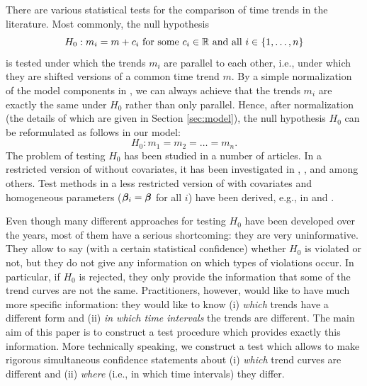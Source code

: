 \documentclass[12pt]{article}
\makeatletter
\renewcommand{\eqref}[1]{\tagform@{\ref{#1}}}
\makeatother
\begin{document}
There are various statistical tests for the comparison of time trends in the literature. Most commonly, the null hypothesis
\[ H_0: m_i = m + c_i \text{ for some } c_i \in \mathbb{R} \text{ and all } i \in \{1,\ldots,n\} \]
is tested under which the trends $m_i$ are parallel to each other, i.e., under which they are shifted versions of a common time trend $m$. By a simple normalization of the model components in \eqref{eq:model_full}, we can always achieve that the trends $m_i$ are exactly the same under $H_0$ rather than only parallel. Hence, after normalization (the details of which are given in Section \ref{sec:model}), the null hypothesis $H_0$ can be reformulated as follows in our model: 
\[ H_0: m_1 = m_2 = \ldots = m_n. \]   
The problem of testing $H_0$ has been studied in a number of articles. In a restricted version of \eqref{eq:model_full} without covariates, it has been investigated in \cite{HaerdleMarron1990}, \cite{Hall1990}, \cite{DegrasWu2012} and \cite{ChenWu2018} among others. Test methods in a less restricted version of \eqref{eq:model_full} with covariates and homogeneous parameters ($\bm{\beta}_i = \bm{\beta}$ for all $i$) have been derived, e.g., in \cite{Zhang2012} and \cite{Hidalgo2014}.


Even though many different approaches for testing $H_0$ have been developed over the years, most of them have a serious shortcoming: they are very uninformative. They allow to say (with a certain statistical confidence) whether $H_0$ is violated or not, but they do not give any information on which types of violations occur. In particular, if $H_0$ is rejected, they only provide the information that some of the trend curves are not the same. Practitioners, however, would like to have much more specific information: they would like to know (i) \textit{which} trends have a different form and (ii) \textit{in which time intervals} the trends are different. The main aim of this paper is to construct a test procedure which provides exactly this information. More technically speaking, we construct a test which allows to make rigorous simultaneous confidence statements about (i) \textit{which} trend curves are different and (ii) \textit{where} (i.e., in which time intervals) they differ. 
\end{document}
